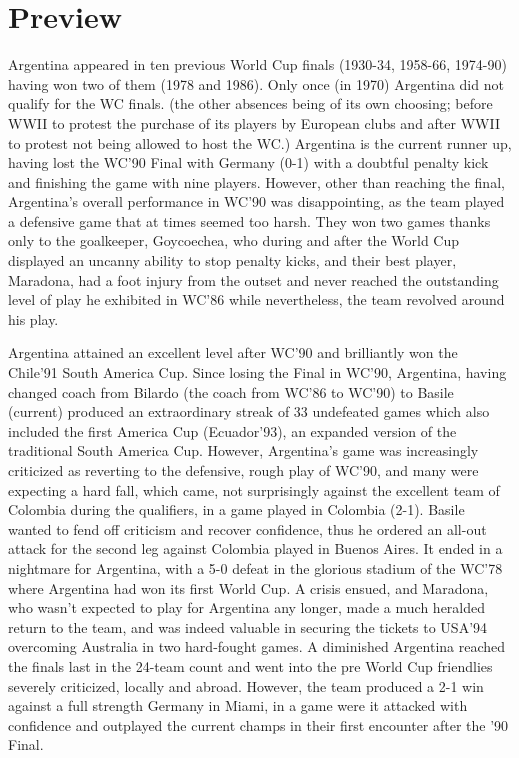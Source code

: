 \section{Preview}
Argentina appeared in ten previous World Cup finals (1930-34, 1958-66, 1974-90)
having won two of them (1978 and 1986).  Only once (in 1970) Argentina did not
qualify for the WC finals. (the other absences being of its own choosing;
before WWII to protest the purchase of its players by European clubs and after
WWII to protest not being allowed to host the WC.) Argentina is the current
runner up, having lost the WC'90 Final with Germany (0-1) with a doubtful  
penalty kick and finishing the game with nine players.  However, other than 
reaching the final, Argentina's overall performance in WC'90 was disappointing,
as the team played a defensive game that at times seemed too harsh. They won 
two games thanks only to the goalkeeper, Goycoechea, who during and after the 
World Cup displayed an uncanny ability to stop penalty kicks, and their best 
player, Maradona, had a foot injury from the outset and never reached the 
outstanding level of play he exhibited in WC'86 while nevertheless, the team 
revolved around his play.

Argentina attained an excellent level after WC'90 and brilliantly won the 
Chile'91 South America Cup.  Since losing the Final in WC'90, Argentina, having
changed coach from Bilardo (the coach from WC'86 to WC'90) to Basile (current)
produced an extraordinary streak of 33 undefeated games which also included the
first America Cup (Ecuador'93), an expanded version of the traditional South
America Cup. However, Argentina's game was increasingly criticized as reverting
to the defensive, rough play of WC'90, and many were expecting a hard fall, 
which came, not surprisingly against the excellent team of Colombia during the 
qualifiers, in a game played in Colombia (2-1). Basile wanted to fend off 
criticism and recover confidence, thus he ordered an all-out attack for the 
second leg against Colombia played in Buenos Aires.  It ended in a nightmare 
for Argentina, with a 5-0 defeat in the glorious stadium of the WC'78 where 
Argentina had won its first World Cup.  A crisis ensued, and Maradona, who 
wasn't expected to play for Argentina any longer, made a much heralded return 
to the team, and was indeed valuable in securing the tickets to USA'94 
overcoming Australia in two hard-fought games.  A diminished Argentina reached
the finals last in the 24-team count and went into the pre World Cup friendlies
severely criticized, locally and abroad. However, the team produced a 2-1 win 
against a full strength Germany in Miami, in a game were it attacked with 
confidence and outplayed the current champs in their first encounter after the 
'90 Final.

